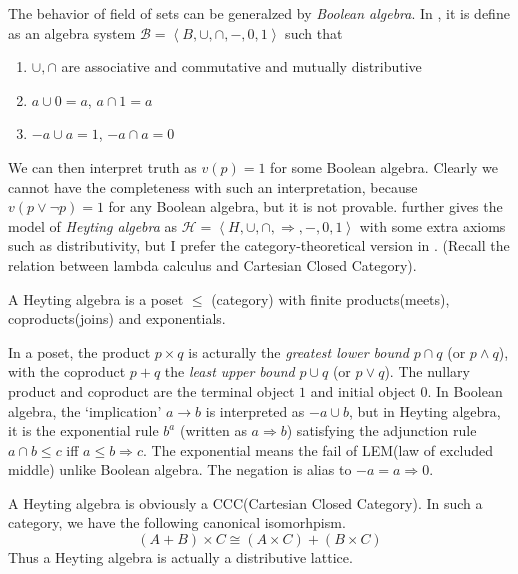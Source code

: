 The behavior of field of sets can be generalzed by {\it Boolean algebra}.
In \cite{Curry-Howard}, it is define as an algebra system 
$\mathcal{B}=\left<B,\cup,\cap,-,0,1\right>$ such that
\begin{enumerate}
    \item $\cup,\cap$ are associative and commutative and mutually distributive
    \item $a\cup 0=a$, $a\cap 1=a$
    \item $-a\cup a=1$, $-a\cap a=0$
\end{enumerate}
\newcommand{\Imply}{\Rightarrow}
We can then interpret truth as $v(p)=1$ for some Boolean algebra.
Clearly we cannot have the completeness with such an interpretation,
because $v(p\vee\neg p)=1$ for any Boolean algebra, but it is not provable.
\cite{Curry-Howard} further gives the model of {\it Heyting algebra} as
$\mathcal{H}=\left<H,\cup,\cap,\Imply,-,0,1\right>$ with some extra
axioms such as distributivity, but I prefer the category-theoretical
version in \cite{cat-awodey}. (Recall the relation between lambda
calculus and Cartesian Closed Category). 

\begin{definition}
    A Heyting algebra is a poset $\le$ (category) with finite
    products(meets), coproducts(joins) and exponentials.
\end{definition}
\begin{remark}
    In a poset, the product $p\times q$ is acturally the 
    {\it greatest lower bound} $p\cap q$ (or $p\wedge q$), with the coproduct
    $p+q$ the {\it least upper bound} $p\cup q$ (or $p\vee q$).
    The nullary product and coproduct are the terminal object $1$
    and initial object $0$. In Boolean algebra, the `implication'
    $a\to b$ is interpreted as $-a\cup b$, but in Heyting algebra,
    it is the exponential rule $b^a$ (written as $a\Imply b$) satisfying
    the adjunction rule $a\cap b\le c$ iff $a\le b\Imply c$. The exponential
    means the fail of LEM(law of excluded middle) unlike Boolean algebra.
    The negation is alias to $-a=a\Imply 0$. 
\end{remark}
\begin{remark}
    A Heyting algebra is obviously a CCC(Cartesian Closed Category).
    In such a category, we have the following canonical isomorhpism.
    $$
        (A+B)\times C\cong(A\times C)+(B\times C)
    $$
    Thus a Heyting algebra is actually a distributive lattice.
\end{remark}

